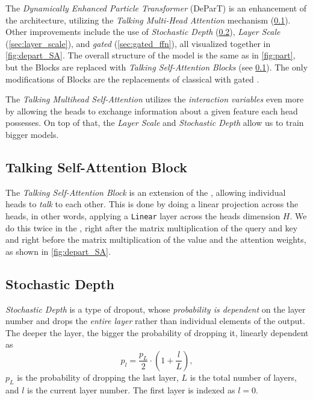 The \emph{Dynamically Enhanced Particle Transformer} (DeParT) is an enhancement of the \ParT architecture, utilizing the \emph{Talking Multi-Head Attention} \cite{deit3} mechanism (\cref{sec:talk_SA}).
Other improvements include the use of \emph{Stochastic Depth} (\cref{sec:stoch_depth}), \emph{Layer Scale} (\cref{sec:layer_scale}), and \emph{gated} \FFN (\cref{sec:gated_ffn}), all visualized together in \cref{fig:depart_SA}.
The overall structure of the model is the same as in \cref{fig:part}, but the \SA Blocks are replaced with \emph{Talking Self-Attention Blocks} (see \cref{sec:talk_SA}).
The only modifications of \CA Blocks are the replacements of classical \FFN with gated \FFN.

The \emph{Talking Multihead Self-Attention} utilizes the \emph{interaction variables} even more by allowing the heads to exchange information about a given feature each head possesses.
On top of that, the \emph{Layer Scale} and \emph{Stochastic Depth} allow us to train bigger models.

\subsection{Talking Self-Attention Block}
\label{sec:talk_SA}
The \emph{Talking Self-Attention Block} \cite{deit3} is an extension of the \MHA, allowing individual heads to \emph{talk} to each other.
This is done by doing a linear projection across the heads, in other words, applying a \texttt{Linear} layer across the heads dimension $H$. 
We do this twice in the \MHA, right after the matrix multiplication of the query and key and right before the matrix multiplication of the value and the attention weights, as shown in \cref{fig:depart_SA}.

\subsection{Stochastic Depth}
\label{sec:stoch_depth}
\emph{Stochastic Depth} \cite{stoch_depth} is a type of dropout, whose \emph{probability is dependent} on the layer number and drops the \emph{entire layer} rather than individual elements of the output.
The deeper the layer, the bigger the probability of dropping it, linearly dependent as
\begin{equation}
    \label{eq:stoch_depth}
    p_l = \frac{p_L}{2} \cdot \left(1 + \frac{l}{L}\right),
\end{equation}
$p_L$ is the probability of dropping the last layer, $L$ is the total number of layers, and $l$ is the current layer number.
The first layer is indexed as $l=0$.

